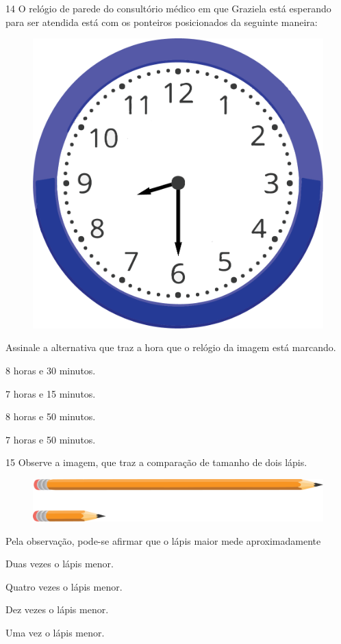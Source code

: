 \num{14} O relógio de parede do consultório médico em que Graziela está esperando
para ser atendida está com os ponteiros posicionados da seguinte maneira:

\begin{figure}[htpb!]
\centering
\includegraphics[width=.3\textwidth]{./media/image100.png}
\end{figure}

\pagebreak
Assinale a alternativa que traz a hora que o relógio da imagem está marcando.

\begin{escolha}
\item
  8 horas e 30 minutos.
\item
  7 horas e 15 minutos.
\item
  8 horas e 50 minutos.
\item
  7 horas e 50 minutos.
\end{escolha}


\num{15} Observe a imagem, que traz a comparação de tamanho de dois lápis.

\begin{figure}[htpb!]
\centering
\includegraphics[width=\textwidth]{./media/image101.png}
\end{figure}

Pela observação, pode-se afirmar que o lápis maior mede aproximadamente

\begin{escolha}
\item
  Duas vezes o lápis menor.
\item
  Quatro vezes o lápis menor.
\item
  Dez vezes o lápis menor.
\item
  Uma vez o lápis menor.
\end{escolha}


